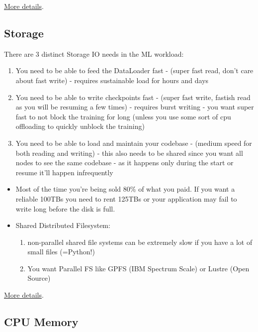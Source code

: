 \documentclass[
]{report}
\providecommand{\tightlist}{%
  \setlength{\itemsep}{0pt}\setlength{\parskip}{0pt}}\usepackage{longtable,booktabs,array}
\begin{document}
\href{../network/README.md\#inter-node-networking}{More details}.

\subsection{Storage}\label{storage}

There are 3 distinct Storage IO needs in the ML workload:

\begin{enumerate}
\def\labelenumi{\arabic{enumi}.}
\tightlist
\item
  You need to be able to feed the DataLoader fast - (super fast read,
  don't care about fast write) - requires sustainable load for hours and
  days
\item
  You need to be able to write checkpoints fast - (super fast write,
  fastish read as you will be resuming a few times) - requires burst
  writing - you want super fast to not block the training for long
  (unless you use some sort of cpu offloading to quickly unblock the
  training)
\item
  You need to be able to load and maintain your codebase - (medium speed
  for both reading and writing) - this also needs to be shared since you
  want all nodes to see the same codebase - as it happens only during
  the start or resume it'll happen infrequently
\end{enumerate}

\begin{itemize}
\item
  Most of the time you're being sold 80\% of what you paid. If you want
  a reliable 100TBs you need to rent 125TBs or your application may fail
  to write long before the disk is full.
\item
  Shared Distributed Filesystem:

  \begin{enumerate}
  \def\labelenumi{\arabic{enumi}.}
  \tightlist
  \item
    non-parallel shared file systems can be extremely slow if you have a
    lot of small files (=Python!)
  \item
    You want Parallel FS like GPFS (IBM Spectrum Scale) or Lustre (Open
    Source)
  \end{enumerate}
\end{itemize}

\href{../storage/README.md}{More details}.

\subsection{CPU Memory}\label{cpu-memory}
\end{document}
